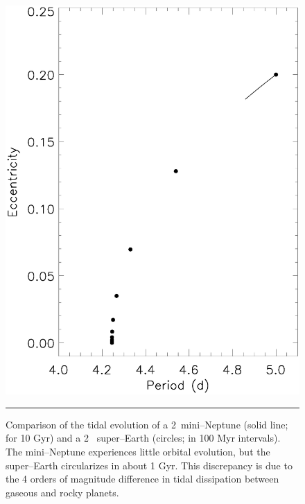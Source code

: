 \begin{figure}[t] 
  \begin{minipage}[c]{0.39\textwidth}
    \includegraphics[width=\textwidth]{figures/compq.ps}
  \end{minipage}\hfill
  \begin{minipage}[c]{0.6\textwidth}
    \caption{Comparison of the tidal evolution of a
  2~\rearth mini--Neptune (solid line; for 10 Gyr) and a 2~\rearth
  super--Earth (circles; in 100 Myr intervals).  The mini--Neptune
  experiences little orbital evolution, but the super--Earth
  circularizes in about 1 Gyr.  This discrepancy is due to the 4
  orders of magnitude difference in tidal dissipation between gaseous
  and rocky planets.}
    \label{fig:compareQ}
    \hspace*{\fill}  
    \hrule
  \end{minipage}
\end{figure}

